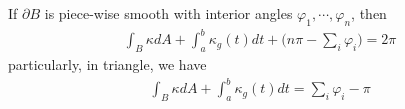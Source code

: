 \documentclass[10pt]{article}
\begin{document}
            \begin{theorem}
                If $\partial B$ is piece-wise smooth with interior angles $\varphi_1, \cdots, \varphi_n$, then
                \begin{equation*}
                    \begin{aligned}
                        \int_B\kappa dA + \int_a^b\kappa_g(t)dt + \bigg(n\pi - \sum\limits_i\varphi_i\bigg) = 2\pi 
                    \end{aligned}
                \end{equation*}
                particularly, in triangle, we have
                \begin{equation*}
                    \begin{aligned}
                        \int_B\kappa dA + \int_a^b\kappa_g(t)dt = \sum\limits_i\varphi_i - \pi 
                    \end{aligned}
                \end{equation*}        
            \end{theorem}
            
\end{document}
